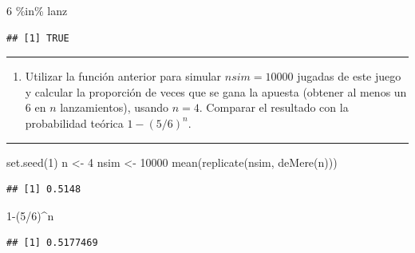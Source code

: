 \documentclass[
]{book}
\newenvironment{Shaded}{\begin{snugshade}}{\end{snugshade}}
\newcommand{\DecValTok}[1]{\textcolor[rgb]{0.00,0.00,0.81}{#1}}
\newcommand{\FunctionTok}[1]{\textcolor[rgb]{0.00,0.00,0.00}{#1}}
\newcommand{\NormalTok}[1]{#1}
\newcommand{\OtherTok}[1]{\textcolor[rgb]{0.56,0.35,0.01}{#1}}
\newcommand{\SpecialCharTok}[1]{\textcolor[rgb]{0.00,0.00,0.00}{#1}}
\providecommand{\tightlist}{%
  \setlength{\itemsep}{0pt}\setlength{\parskip}{0pt}}
\theoremstyle{break}
\theoremstyle{nonumberplain}
\begin{document}
\begin{Shaded}
\begin{Highlighting}[]
\DecValTok{6} \SpecialCharTok{\%in\%}\NormalTok{ lanz}
\end{Highlighting}
\end{Shaded}

\begin{verbatim}
## [1] TRUE
\end{verbatim}

\begin{center}\rule{0.5\linewidth}{0.5pt}\end{center}

\begin{enumerate}
\def\labelenumi{\alph{enumi})}
\setcounter{enumi}{1}
\tightlist
\item
  Utilizar la función anterior para simular \(nsim=10000\) jugadas
  de este juego y calcular la proporción de veces que se gana la
  apuesta (obtener al menos un 6 en \(n\) lanzamientos), usando
  \(n=4\). Comparar el resultado con la probabilidad teórica
  \(1-(5/6)^{n}\).
\end{enumerate}

\begin{center}\rule{0.5\linewidth}{0.5pt}\end{center}

\begin{Shaded}
\begin{Highlighting}[]
\FunctionTok{set.seed}\NormalTok{(}\DecValTok{1}\NormalTok{)}
\NormalTok{n }\OtherTok{\textless{}{-}} \DecValTok{4}
\NormalTok{nsim }\OtherTok{\textless{}{-}} \DecValTok{10000}
\FunctionTok{mean}\NormalTok{(}\FunctionTok{replicate}\NormalTok{(nsim, }\FunctionTok{deMere}\NormalTok{(n)))}
\end{Highlighting}
\end{Shaded}

\begin{verbatim}
## [1] 0.5148
\end{verbatim}

\begin{Shaded}
\begin{Highlighting}[]
\DecValTok{1}\SpecialCharTok{{-}}\NormalTok{(}\DecValTok{5}\SpecialCharTok{/}\DecValTok{6}\NormalTok{)}\SpecialCharTok{\^{}}\NormalTok{n}
\end{Highlighting}
\end{Shaded}

\begin{verbatim}
## [1] 0.5177469
\end{verbatim}
\end{document}
